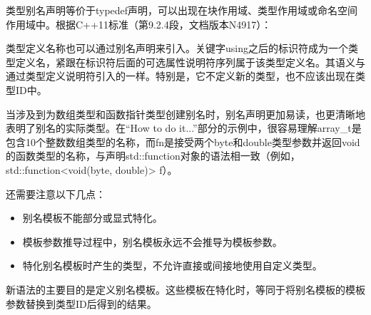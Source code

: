 类型别名声明等价于typedef声明，可以出现在块作用域、类型作用域或命名空间作用域中。根据C++11标准（第9.2.4段，文档版本N4917）：

\begin{myTip}
类型定义名称也可以通过别名声明来引入。关键字using之后的标识符成为一个类型定义名，紧跟在标识符后面的可选属性说明符序列属于该类型定义名。其语义与通过类型定义说明符引入的一样。特别是，它不定义新的类型，也不应该出现在类型ID中。
\end{myTip}

当涉及到为数组类型和函数指针类型创建别名时，别名声明更加易读，也更清晰地表明了别名的实际类型。在“How to do it...”部分的示例中，很容易理解array\_t是包含10个整数数组类型的名称，而fn是接受两个byte和double类型参数并返回void的函数类型的名称，与声明std::function对象的语法相一致（例如，std::function<void(byte, double)> f）。

还需要注意以下几点：

\begin{itemize}
\item
别名模板不能部分或显式特化。

\item
模板参数推导过程中，别名模板永远不会推导为模板参数。

\item
特化别名模板时产生的类型，不允许直接或间接地使用自定义类型。
\end{itemize}

新语法的主要目的是定义别名模板。这些模板在特化时，等同于将别名模板的模板参数替换到类型ID后得到的结果。







